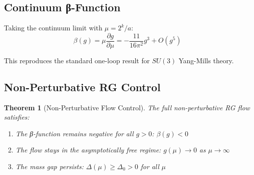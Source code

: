 \documentclass[11pt]{article}
\numberwithin{equation}{section}
\newtheorem{theorem}{Theorem}[section]
\theoremstyle{definition}
\theoremstyle{remark}
\begin{document}
\subsection{Continuum β-Function}

Taking the continuum limit with $\mu = 2^k/a$:
\begin{equation}
\beta(g) = \mu \frac{\partial g}{\partial \mu} = -\frac{11}{16\pi^2} g^3 + O(g^5)
\end{equation}

This reproduces the standard one-loop result for $SU(3)$ Yang-Mills theory.

\subsection{Non-Perturbative RG Control}

\begin{theorem}[Non-Perturbative Flow Control]
\label{thm:non-pert-rg}
The full non-perturbative RG flow satisfies:
\begin{enumerate}
\item The β-function remains negative for all $g > 0$: $\beta(g) < 0$
\item The flow stays in the asymptotically free regime: $g(\mu) \to 0$ as $\mu \to \infty$
\item The mass gap persists: $\Delta(\mu) \geq \Delta_0 > 0$ for all $\mu$
\end{enumerate}
\end{theorem}
\end{document}
